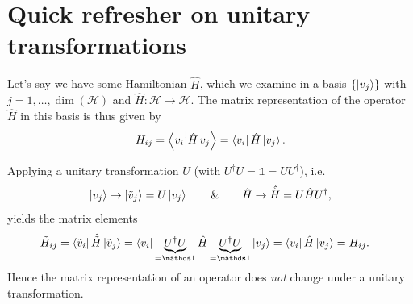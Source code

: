 \documentclass[../../../main.tex]{subfiles}
\begin{document}
\section{Quick refresher on unitary transformations}
\label{sec:unitary-transformations}

Let's say we have some Hamiltonian $\hat H$, which we examine in a basis $\{\left\lvert v_j \right\rangle\}$ with
$j=1,\dots,\dim(\mathcal H)$ and $\hat H\colon\mathcal H\to\mathcal H$. The matrix
representation of the operator $\hat H$ in this basis is thus given by
\begin{equation}
H_{ij}=\left\langle v_i \middle| \hat H\,v_j \right\rangle=\left\langle v_i \right\rvert\hat H\left\lvert v_j \right\rangle.
\end{equation}

Applying a unitary transformation $U$ (with $U^\dagger U=\mathds 1=UU^\dagger$), i.e.
\begin{equation}
\left\lvert v_j \right\rangle\to\left\lvert \tilde v_j \right\rangle=U\left\lvert v_j \right\rangle\qquad\&\qquad\hat H\to\hat{\tilde H}=U\hat H U^\dagger,
\end{equation}
yields the matrix elements
\begin{align}
\tilde H_{ij}=\bra{\tilde v_i}\hat{\tilde H}\ket{\tilde v_j}
&=\bra{v_i}\underbrace{U^\dagger U}_{=\mathds 1}\hat H
\underbrace{U^\dagger U}_{=\mathds 1}\ket{v_j}
=\bra{v_i}\hat H\ket{v_j}=H_{ij}.
\end{align}
Hence the matrix representation of an operator does \emph{not} change under a unitary
transformation.
\end{document}
